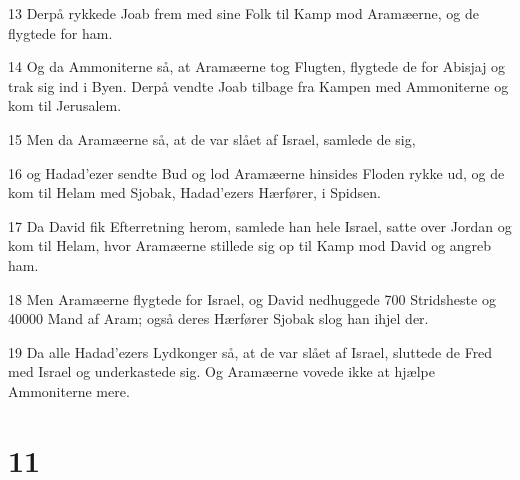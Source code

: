 \par 13 Derpå rykkede Joab frem med sine Folk til Kamp mod Aramæerne, og de flygtede for ham.
\par 14 Og da Ammoniterne så, at Aramæerne tog Flugten, flygtede de for Abisjaj og trak sig ind i Byen. Derpå vendte Joab tilbage fra Kampen med Ammoniterne og kom til Jerusalem.
\par 15 Men da Aramæerne så, at de var slået af Israel, samlede de sig,
\par 16 og Hadad'ezer sendte Bud og lod Aramæerne hinsides Floden rykke ud, og de kom til Helam med Sjobak, Hadad'ezers Hærfører, i Spidsen.
\par 17 Da David fik Efterretning herom, samlede han hele Israel, satte over Jordan og kom til Helam, hvor Aramæerne stillede sig op til Kamp mod David og angreb ham.
\par 18 Men Aramæerne flygtede for Israel, og David nedhuggede 700 Stridsheste og 40000 Mand af Aram; også deres Hærfører Sjobak slog han ihjel der.
\par 19 Da alle Hadad'ezers Lydkonger så, at de var slået af Israel, sluttede de Fred med Israel og underkastede sig. Og Aramæerne vovede ikke at hjælpe Ammoniterne mere.

\chapter{11}

